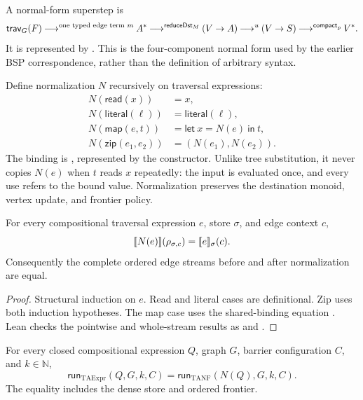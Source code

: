 \begin{definition}
A normal-form \TA{} superstep is
\[
 \mathsf{trav}_G(F)
 \mathbin{\longrightarrow}^{\textnormal{one typed edge term }m} A^*
 \mathbin{\longrightarrow}^{\mathsf{reduceDst}_M}(V\to A)
 \mathbin{\longrightarrow}^{u}(V\to S)
 \mathbin{\longrightarrow}^{\mathsf{compact}_p}V^*.
\]
It is represented by .  This is the
four-component normal form used by the earlier BSP correspondence, rather
than the definition of arbitrary \TA{} syntax.
\end{definition}

Define normalization $N$ recursively on traversal expressions:
\[
\begin{aligned}
 N(\mathsf{read}(x)) &= x,\\
 N(\mathsf{literal}(\ell)) &= \mathsf{literal}(\ell),\\
 N(\mathsf{map}(e,t)) &= \mathsf{let}\ x=N(e)\ \mathsf{in}\ t,\\
 N(\mathsf{zip}(e_1,e_2)) &= (N(e_1),N(e_2)).
\end{aligned}
\]
The binding is , represented by the 
constructor.  Unlike tree substitution, it never copies $N(e)$ when $t$ reads
$x$ repeatedly: the input is evaluated once, and every use refers to the
bound value.  Normalization preserves the destination monoid, vertex update,
and frontier policy.

\begin{lemma}
\label{lem:ta-pointwise-normalization}
For every compositional traversal expression $e$, store $\sigma$, and edge
context $c$,
\[
 \lbrack\!\lbrack N(e) \rbrack\!\rbrack(\rho_{\sigma,c})=\lbrack\!\lbrack e \rbrack\!\rbrack_{\sigma}(c).
\]
Consequently the complete ordered edge streams before and after normalization
are equal.
\end{lemma}

\begin{proof}
Structural induction on $e$.  Read and literal cases are definitional.  Zip
uses both induction hypotheses.  The map case uses the shared-binding
equation .  Lean checks the pointwise and
whole-stream results as  and
.
\end{proof}

\begin{theorem}
\label{thm:ta-normalization}
For every closed compositional \TA{} expression $Q$, graph $G$, barrier
configuration $C$, and $k\in\mathbb{N}$,
\[
 \mathsf{run}_{\mathrm{TAExpr}}(Q,G,k,C)
 =\mathsf{run}_{\mathrm{TANF}}(N(Q),G,k,C).
\]
The equality includes the dense store and ordered frontier.
\end{theorem}

